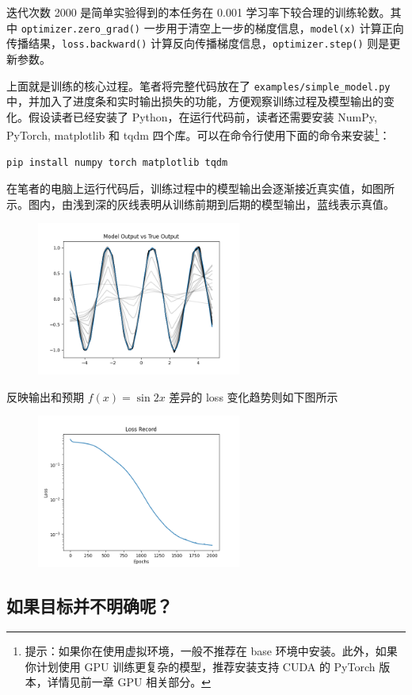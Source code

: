 迭代次数 2000 是简单实验得到的本任务在 0.001 学习率下较合理的训练轮数。其中 \texttt{optimizer.zero\_grad()} 一步用于清空上一步的梯度信息，\texttt{model(x)} 计算正向传播结果，\texttt{loss.backward()} 计算反向传播梯度信息，\texttt{optimizer.step()} 则是更新参数。

上面就是训练的核心过程。笔者将完整代码放在了 \texttt{examples/simple\_model.py} 中，并加入了进度条和实时输出损失的功能，方便观察训练过程及模型输出的变化。假设读者已经安装了 Python，在运行代码前，读者还需要安装 NumPy, PyTorch, matplotlib 和 tqdm 四个库。可以在命令行使用下面的命令来安装\footnote{提示：如果你在使用虚拟环境，一般不推荐在 base 环境中安装。此外，如果你计划使用 GPU 训练更复杂的模型，推荐安装支持 CUDA 的 PyTorch 版本，详情见前一章 GPU 相关部分。}：
\begin{verbatim}
pip install numpy torch matplotlib tqdm
\end{verbatim}

在笔者的电脑上运行代码后，训练过程中的模型输出会逐渐接近真实值，如图所示。图内，由浅到深的灰线表明从训练前期到后期的模型输出，蓝线表示真值。
\begin{figure}[H]
\centering
\includegraphics[width=0.6\textwidth]{img/simple_model_output.png}
\end{figure}

反映输出和预期 $f(x) = \sin 2x$ 差异的 loss 变化趋势则如下图所示
\begin{figure}[H]
\centering
\includegraphics[width=0.6\textwidth]{img/simple_model_loss.png}
\end{figure}

\newpage

\subsection{如果目标并不明确呢？}